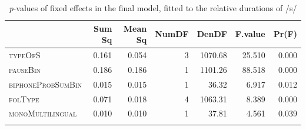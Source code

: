 \begin{table}\fontsize{10}{11}
\caption{\textit{p}-values of fixed effects in the final model, fitted to the relative durations of /s/}
\label{tab:4.9}
\centering
\begin{tabular}{lrrrrrr} 
\lsptoprule
~                 & Sum Sq & Mean Sq & NumDF & DenDF   & F.value & Pr(F)  \\ 
\midrule
\textsc{typeOfS}           & 0.161  & 0.054   & 3     & 1070.68 & 25.510  & 0.000  \\
\textsc{pauseBin}          & 0.186  & 0.186   & 1     & 1101.26 & 88.518  & 0.000  \\
\textsc{biphoneProbSumBin} & 0.015  & 0.015   & 1     & 36.32   & 6.917   & 0.012  \\
\textsc{folType}           & 0.071  & 0.018   & 4     & 1063.31 & 8.389   & 0.000  \\
\textsc{monoMultilingual}  & 0.010  & 0.010   & 1     & 37.81   & 4.561   & 0.039  \\
\lspbottomrule
\end{tabular}
\end{table}




